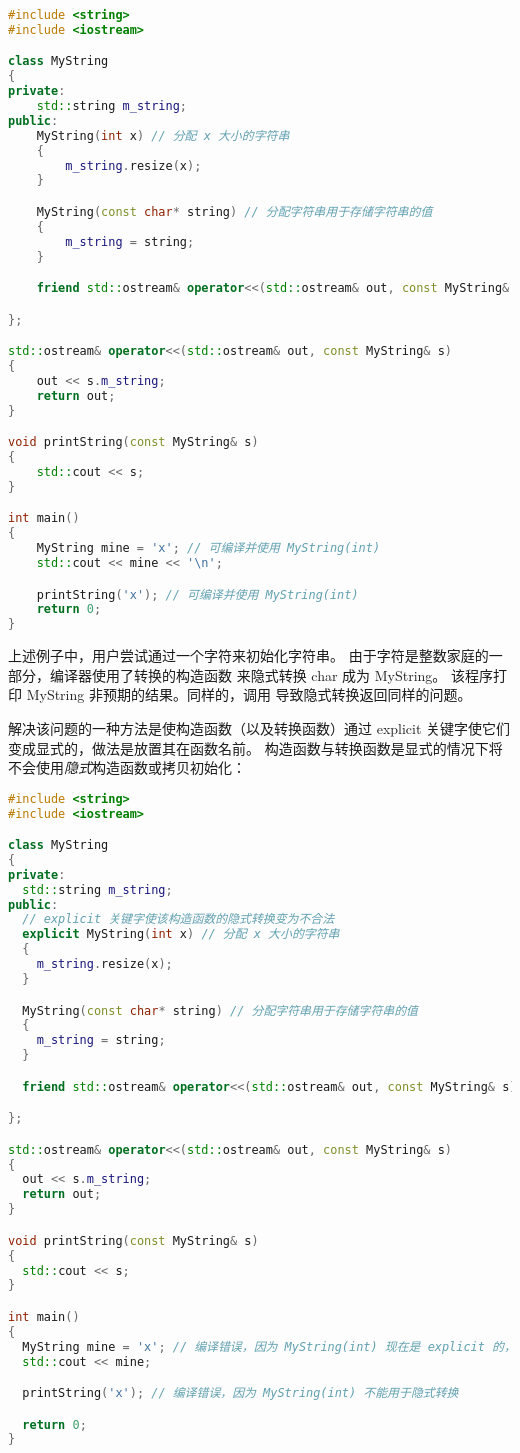 \documentclass[../../LearnCpp.tex]{subfiles}
\begin{document}
\begin{lstlisting}[language=C++]
#include <string>
#include <iostream>

class MyString
{
private:
	std::string m_string;
public:
	MyString(int x) // 分配 x 大小的字符串
	{
		m_string.resize(x);
	}

	MyString(const char* string) // 分配字符串用于存储字符串的值
	{
		m_string = string;
	}

	friend std::ostream& operator<<(std::ostream& out, const MyString& s);

};

std::ostream& operator<<(std::ostream& out, const MyString& s)
{
	out << s.m_string;
	return out;
}

void printString(const MyString& s)
{
	std::cout << s;
}

int main()
{
	MyString mine = 'x'; // 可编译并使用 MyString(int)
	std::cout << mine << '\n';

	printString('x'); // 可编译并使用 MyString(int)
	return 0;
}
\end{lstlisting}

上述例子中，用户尝试通过一个字符来初始化字符串。
由于字符是整数家庭的一部分，编译器使用了转换的构造函数  来隐式转换 char 成为 MyString。
该程序打印 MyString 非预期的结果。同样的，调用  导致隐式转换返回同样的问题。

解决该问题的一种方法是使构造函数（以及转换函数）通过 explicit 关键字使它们变成显式的，做法是放置其在函数名前。
构造函数与转换函数是显式的情况下将不会使用\textit{隐式}构造函数或拷贝初始化：

\begin{lstlisting}[language=C++]
#include <string>
#include <iostream>

class MyString
{
private:
  std::string m_string;
public:
  // explicit 关键字使该构造函数的隐式转换变为不合法
  explicit MyString(int x) // 分配 x 大小的字符串
  {
    m_string.resize(x);
  }

  MyString(const char* string) // 分配字符串用于存储字符串的值
  {
    m_string = string;
  }

  friend std::ostream& operator<<(std::ostream& out, const MyString& s);

};

std::ostream& operator<<(std::ostream& out, const MyString& s)
{
  out << s.m_string;
  return out;
}

void printString(const MyString& s)
{
  std::cout << s;
}

int main()
{
  MyString mine = 'x'; // 编译错误，因为 MyString(int) 现在是 explicit 的，且没有任何与之匹配的
  std::cout << mine;

  printString('x'); // 编译错误，因为 MyString(int) 不能用于隐式转换

  return 0;
}
\end{lstlisting}
\end{document}
